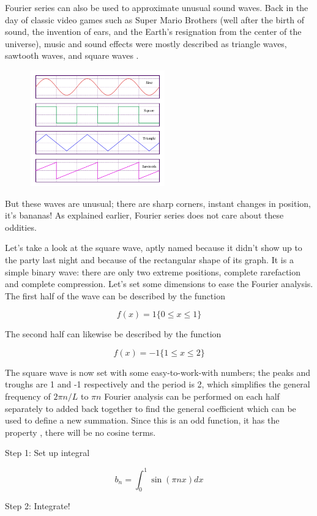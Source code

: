 \documentclass{tufte-handout}
\begin{document}
Fourier series can also be used to approximate unusual sound waves. Back in the day of classic video games such as Super Mario Brothers (well after the birth of sound, the invention of ears, and the Earth's resignation from the center of the universe), music and sound effects were mostly described as triangle waves, sawtooth waves, and square waves \cite{Wolfram, Chip}.

\includegraphics[width=8cm, height=5cm]{Waveforms.png}

But these waves are unusual; there are sharp corners, instant changes in position, it's bananas! As explained earlier, Fourier series does not care about these oddities.
	
Let's take a look at the square wave, aptly named because it didn't show up to the party last night and because of the rectangular shape of its graph. It is a simple binary wave: there are only two extreme positions, complete rarefaction and complete compression. Let's set some dimensions to ease the Fourier analysis. The first half of the wave can be described by the function

\newequation
$${f(x)=1 \{0\leq x\leq 1\}}$$

The second half can likewise be described by the function

\newequation
$${f(x)=-1 \{1\leq x\leq 2\}}$$

The square wave is now set with some easy-to-work-with numbers; the peaks and troughs are 1 and -1 respectively and the period is 2, which simplifies the general frequency of ${2\pi n/L}$ to ${\pi n}$ Fourier analysis can be performed on each half separately to added back together to find the general coefficient which can be used to define a new summation. Since this is an odd function, it has the property , there will be no cosine terms.

	Step 1: Set up integral
	
	\newequation$${b_n=\int_0^1 \sin(\pi nx)dx}$$
	
	Step 2: Integrate!
	
\end{document}
